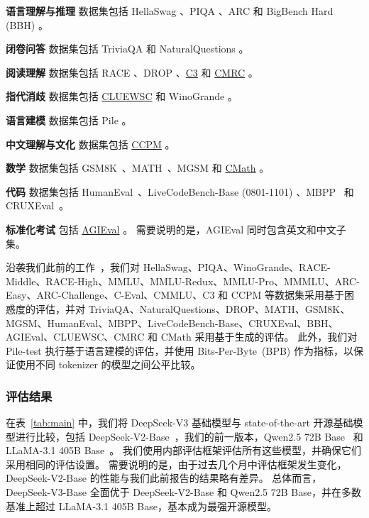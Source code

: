 \documentclass[11pt, a4paper, logo, copyright, nonumbering]{deepseek}
\newcommand{\dsvii}{DeepSeek-V2}
\newcommand{\dsviii}{DeepSeek-V3}
\begin{document}
\textbf{语言理解与推理} 数据集包括 HellaSwag \citep{hellaswag}、PIQA \citep{piqa}、ARC \citep{arc} 和 BigBench Hard (BBH) \citep{bbh}。

\textbf{闭卷问答} 数据集包括 TriviaQA \citep{joshi-etal-2017-triviaqa} 和 NaturalQuestions \citep{naturalquestions}。

\textbf{阅读理解} 数据集包括 RACE \cite{race}、DROP \citep{drop}、\underline{C3} \citep{sun2019investigating} 和 \underline{CMRC} \citep{cui-etal-2019-span}。

\textbf{指代消歧} 数据集包括 \underline{CLUEWSC} \citep{clue} 和 WinoGrande \cite{sakaguchi2019winogrande}。

\textbf{语言建模} 数据集包括 Pile \citep{pile}。

\textbf{中文理解与文化} 数据集包括 \underline{CCPM} \citep{li2021ccpm}。

\textbf{数学} 数据集包括 GSM8K~\citep{gsm8k}、MATH~\citep{hendrycks2021measuring}、MGSM \citep{mgsm} 和 \underline{CMath} \citep{wei2023cmath}。

\textbf{代码} 数据集包括 HumanEval~\citep{codex}、LiveCodeBench-Base (0801-1101) \citep{livecodebench}、MBPP~\citep{mbpp} 和 CRUXEval~\citep{gu2024cruxeval}。

\textbf{标准化考试} 包括 \underline{AGIEval} \citep{agieval}。
需要说明的是，AGIEval 同时包含英文和中文子集。

沿袭我们此前的工作~\citep{dsvi,dsvii}，我们对 HellaSwag、PIQA、WinoGrande、RACE-Middle、RACE-High、MMLU、MMLU-Redux、MMLU-Pro、MMMLU、ARC-Easy、ARC-Challenge、C-Eval、CMMLU、C3 和 CCPM 等数据集采用基于困惑度的评估，并对 TriviaQA、NaturalQuestions、DROP、MATH、GSM8K、MGSM、HumanEval、MBPP、LiveCodeBench-Base、CRUXEval、BBH、AGIEval、CLUEWSC、CMRC 和 CMath 采用基于生成的评估。
此外，我们对 Pile-test 执行基于语言建模的评估，并使用 Bits-Per-Byte~(BPB) 作为指标，以保证使用不同 tokenizer 的模型之间公平比较。



\subsubsection{评估结果}

在表~\ref{tab:main} 中，我们将 \dsviii{} 基础模型与 state-of-the-art 开源基础模型进行比较，包括 \dsvii{}-Base~\citep{dsvii}，我们的前一版本，Qwen2.5 72B Base~\citep{qwen2_5} 和 LLaMA-3.1 405B Base~\citep{llama3_1_405b}。
我们使用内部评估框架评估所有这些模型，并确保它们采用相同的评估设置。
需要说明的是，由于过去几个月中评估框架发生变化，\dsvii{}-Base 的性能与我们此前报告的结果略有差异。
总体而言，\dsviii{}-Base 全面优于 \dsvii{}-Base 和 Qwen2.5 72B Base，并在多数基准上超过 LLaMA-3.1 405B Base，基本成为最强开源模型。
\end{document}

